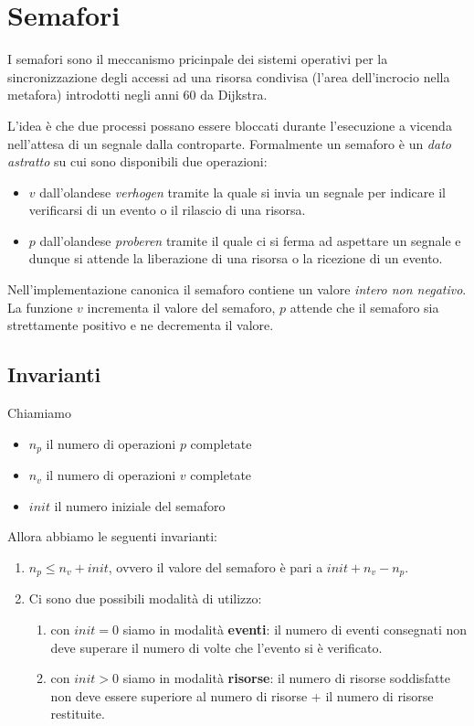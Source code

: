 \documentclass{article}
\begin{document}
\section{Semafori}

I semafori sono il meccanismo pricinpale dei sistemi operativi per la
sincronizzazione degli accessi ad una risorsa condivisa (l'area dell'incrocio
nella metafora) introdotti negli anni 60 da Dijkstra.

L'idea \`e che due processi possano essere bloccati durante l'esecuzione a
vicenda nell'attesa di un segnale dalla controparte.
Formalmente un semaforo \`e un \emph{dato astratto} su cui sono disponibili due
operazioni:
\begin{itemize}
  \item $v$ dall'olandese \emph{verhogen} tramite la quale si invia un segnale per
    indicare il verificarsi di un evento o il rilascio di una risorsa.
  \item $p$ dall'olandese \emph{proberen} tramite il quale ci si ferma ad
    aspettare un segnale e dunque si attende la liberazione di una risorsa o la
    ricezione di un evento.
\end{itemize}

Nell'implementazione canonica il semaforo contiene un valore \emph{intero non
negativo}. La funzione $v$ incrementa il valore del semaforo, $p$ attende che il
semaforo sia strettamente positivo e ne decrementa il valore.

\subsection{Invarianti}

Chiamiamo
\begin{itemize}
  \item $n_p$ il numero di operazioni $p$ completate
  \item $n_v$ il numero di operazioni $v$ completate
  \item $init$ il numero iniziale del semaforo
\end{itemize}

Allora abbiamo le seguenti invarianti:
\begin{enumerate}
  \item $n_p \leq n_v + init$, ovvero il valore del semaforo \`e pari a $init + n_v - n_p$.
  \item Ci sono due possibili modalit\`a di utilizzo:
    \begin{enumerate}
      \item con $init = 0$ siamo in modalit\`a \textbf{eventi}: il numero di eventi
        consegnati non deve superare il numero di volte che l'evento si \`e verificato.
      \item con $init > 0$ siamo in modalit\`a \textbf{risorse}: il numero di risorse
        soddisfatte non deve essere superiore al numero di risorse + il numero
        di risorse restituite.
    \end{enumerate}
\end{enumerate}
\end{document}
